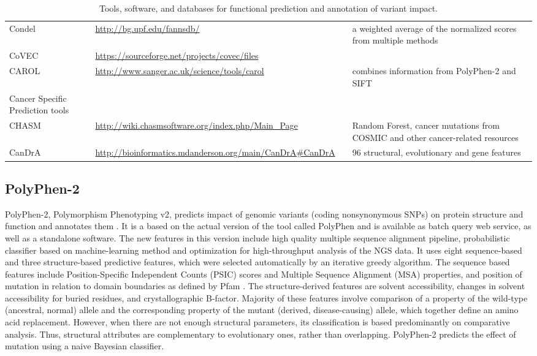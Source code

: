 \documentclass[10pt,letterpaper]{article}
\begin{document}
\begin{table}[p]
\begin{tabularx}{\textwidth}{p{3cm}Xp{1.7cm}X}
  Condel & \url{http://bg.upf.edu/fannsdb/} & \cite{Gonzalez-Perez2011-gc} & a weighted average of the normalized scores from multiple methods \\
  CoVEC & \url{https://sourceforge.net/projects/covec/files} &   &   \\
  CAROL & \url{http://www.sanger.ac.uk/science/tools/carol} & \cite{Lopes2012-je} & combines information from PolyPhen-2 and SIFT \\
  Cancer Specific Prediction tools &  &  &   \\
  CHASM & \url{http://wiki.chasmsoftware.org/index.php/Main_Page} & \cite{Carter2009-ci} & Random Forest, cancer mutations from COSMIC and other cancer-related resources \\
  CanDrA & \url{http://bioinformatics.mdanderson.org/main/CanDrA\#CanDrA} & \cite{Mao2013-ie} & 96  structural, evolutionary and gene features  \\
   \hline
\end{tabularx}
\caption{Tools, software, and databases for functional prediction and annotation of variant impact. }
\label{table:2}
\end{table}

\subsection{PolyPhen-2}

PolyPhen-2, Polymorphism
Phenotyping v2, predicts impact of genomic variants (coding
nonsynonymous SNPs) on protein structure and function and annotates
them \cite{Adzhubei2013-nj}. It is a based on the actual version of
the tool called PolyPhen and is available as batch query web service,
as well as a standalone software. The new features in this version
include high quality multiple sequence alignment pipeline,
probabilistic classifier based on machine-learning method and
optimization for high-throughput analysis of the NGS data. It uses
eight sequence-based and three structure-based predictive features,
which were selected automatically by an iterative greedy
algorithm. The sequence based features include Position-Specific
Independent Counts (PSIC) scores and Multiple Sequence Alignment (MSA)
properties, and position of mutation in relation to domain boundaries
as defined by Pfam \cite{Bateman2004-da}. The structure-derived
features are solvent accessibility, changes in solvent accessibility
for buried residues, and crystallographic B-factor. Majority of these
features involve comparison of a property of the wild-type (ancestral,
normal) allele and the corresponding property of the mutant (derived,
disease-causing) allele, which together define an amino acid
replacement. However, when there are not enough structural parameters,
its classification is based predominantly on comparative
analysis. Thus, structural attributes are complementary to
evolutionary ones, rather than overlapping. PolyPhen-2 predicts the
effect of mutation using a naive Bayesian classifier.
\end{document}
